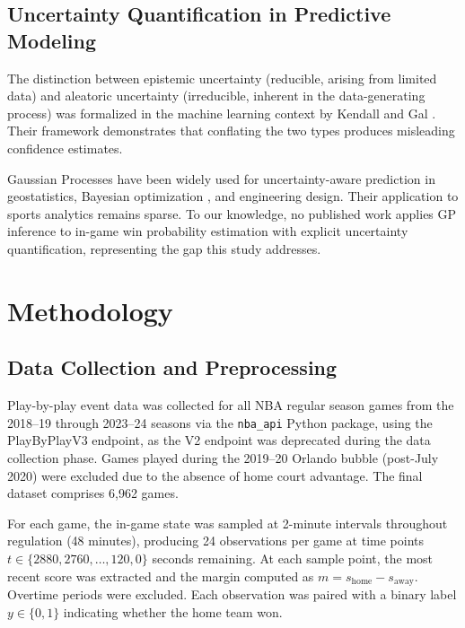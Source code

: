 \documentclass[conference]{IEEEtran}
\begin{document}
\subsection{Uncertainty Quantification in Predictive Modeling}

The distinction between epistemic uncertainty (reducible, arising from limited data) and aleatoric uncertainty (irreducible, inherent in the data-generating process) was formalized in the machine learning context by Kendall and Gal \cite{kendall2017}. Their framework demonstrates that conflating the two types produces misleading confidence estimates.

Gaussian Processes have been widely used for uncertainty-aware prediction in geostatistics, Bayesian optimization \cite{frazier2018}, and engineering design. Their application to sports analytics remains sparse. To our knowledge, no published work applies GP inference to in-game win probability estimation with explicit uncertainty quantification, representing the gap this study addresses.

\section{Methodology}

\subsection{Data Collection and Preprocessing}

Play-by-play event data was collected for all NBA regular season games from the 2018--19 through 2023--24 seasons via the \texttt{nba\_api} Python package, using the PlayByPlayV3 endpoint, as the V2 endpoint was deprecated during the data collection phase. Games played during the 2019--20 Orlando bubble (post-July 2020) were excluded due to the absence of home court advantage. The final dataset comprises 6,962 games.

For each game, the in-game state was sampled at 2-minute intervals throughout regulation (48 minutes), producing 24 observations per game at time points $t \in \{2880, 2760, \ldots, 120, 0\}$ seconds remaining. At each sample point, the most recent score was extracted and the margin computed as $m = s_{\text{home}} - s_{\text{away}}$. Overtime periods were excluded. Each observation was paired with a binary label $y \in \{0, 1\}$ indicating whether the home team won.
\end{document}
